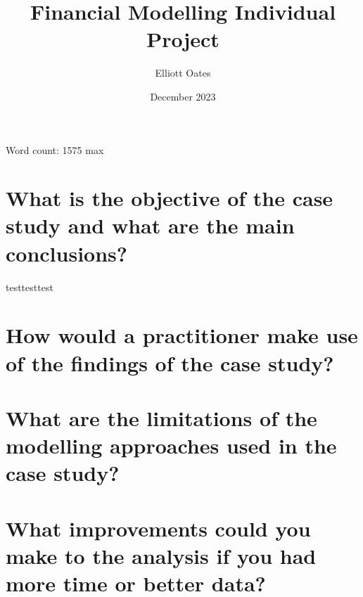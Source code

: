 \documentclass{article}
\title{Financial Modelling Individual Project}
\author{Elliott Oates}
\date{December 2023}
\begin{document}
\maketitle

Word count: 1575 max 

\newpage\section*{What is the objective of the case study and what are the main conclusions?}

testtesttest \cite{benninga2014monte}

\newpage\section*{How would a practitioner make use of the findings of the case study?}

\newpage\section*{What are the limitations of the modelling approaches used in the case study?}

\newpage\section*{What improvements could you make	to the	analysis if	you	had	more time or better data?}

 

\end{document}
